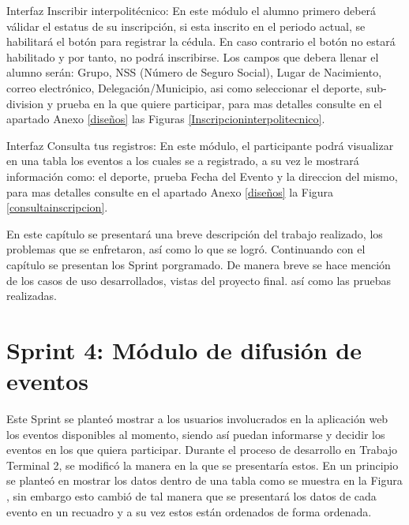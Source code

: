 	\noindent Interfaz Inscribir interpolitécnico: En este módulo el alumno primero deberá válidar el estatus de su inscripción, si esta inscrito en el periodo actual, se habilitará el botón para registrar la cédula. En caso contrario el botón no estará habilitado y por tanto, no podrá inscribirse. Los campos que debera llenar el alumno serán: Grupo, NSS (Número de Seguro Social), Lugar de Nacimiento, correo electrónico, Delegación/Municipio, asi como seleccionar el deporte, sub-division y prueba en la que quiere participar, para mas detalles consulte en el apartado Anexo \ref{diseños} las Figuras \ref{Inscripcioninterpolitecnico}.
	\newline
	
	\noindent Interfaz Consulta tus registros: En este módulo, el participante podrá visualizar en una tabla los eventos a los cuales se a registrado, a su vez le mostrará información como: el deporte, prueba Fecha del Evento y la direccion del mismo, para mas detalles consulte en el apartado Anexo \ref{diseños} la Figura \ref{consultainscripcion}.
	\newline
	
	\noindent En este capítulo se presentará una breve descripción del trabajo realizado, los problemas que se enfretaron, así como lo que se logró. Continuando con el capítulo se presentan los Sprint porgramado. 
	De manera breve se hace mención de los casos de uso desarrollados, vistas del proyecto final. así como las pruebas realizadas.
	
	\section{Sprint 4: Módulo de difusión de eventos}
	\noindent Este Sprint se planteó mostrar a los usuarios involucrados en la aplicación web los eventos disponibles al momento, siendo así puedan informarse y decidir los eventos en los que quiera participar. Durante el proceso de desarrollo en Trabajo Terminal 2, se modificó la manera en la que se presentaría estos. 
	En un principio se planteó en mostrar los datos dentro de una tabla como se muestra en la Figura  , sin embargo esto cambió de tal manera que se presentará los datos de cada evento en un recuadro y a su vez estos están ordenados de forma ordenada.
	
